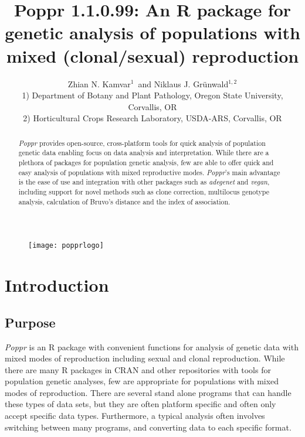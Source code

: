 \documentclass[letterpaper]{article}\usepackage[]{graphicx}\usepackage[]{color}
\title{Poppr 1.1.0.99: An R package for genetic analysis of populations with mixed (clonal/sexual) reproduction}
\author{Zhian N. Kamvar$^{1}$\ and Niklaus J. Gr\"unwald$^{1,2}$\\\scriptsize{1) Department of Botany and Plant Pathology, Oregon State University, Corvallis, OR}\\\scriptsize{2) Horticultural Crops Research Laboratory, USDA-ARS, Corvallis, OR}}
\newcommand{\tab}{\hspace*{1em}}
\begin{document}






\maketitle
\begin{abstract}
\textit{Poppr} provides open-source, cross-platform tools for quick analysis of population genetic data enabling focus on data analysis and interpretation. While there are a plethora of packages for population genetic analysis, few are able to offer quick and easy analysis of populations with mixed reproductive modes. \textit{Poppr}'s main advantage is the ease of use and integration with other packages such as \textit{adegenet} and \textit{vegan}, including support for novel methods such as clone correction, multilocus genotype analysis, calculation of Bruvo's distance and the index of association. 
\end{abstract}
\begin{figure}[b]
  \centering
  \label{logo}
  \texttt{[image: popprlogo]}
\end{figure}
\newpage
\begingroup
\hypersetup{linkcolor=black}
\tableofcontents
\endgroup

\section{Introduction}\label{intro}
\subsection{Purpose}\label{intro:purpose}

\tab\tab\textit{Poppr} is an R package with convenient functions for analysis of genetic data with mixed modes of reproduction including sexual and clonal reproduction. While there are many R packages in CRAN and other repositories with tools for population genetic analyses, few are appropriate for populations with mixed modes of reproduction. There are several stand alone programs that can handle these types of data sets, but they are often platform specific and often only accept specific data types. Furthermore, a typical analysis often involves switching between many programs, and converting data to each specific format.
\end{document}
